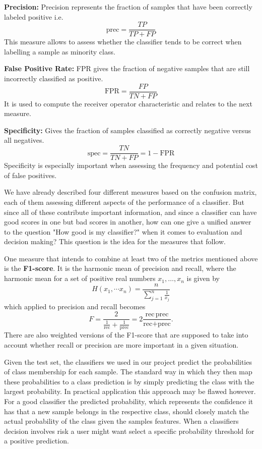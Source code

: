 \textbf{Precision:}
Precision represents the fraction of samples that have been correctly labeled positive i.e.
\[
	\text{prec} = \frac{TP}{TP + FP}
\]
This measure allows to assess whether the classifier tends to be correct when labelling a sample as minority class.


\textbf{False Positive Rate:}
FPR gives the fraction of negative samples that are still incorrectly classified as positive.
\[
	\text{FPR} = \frac{FP}{TN + FP}
\]
It is used to compute the receiver operator characteristic and relates to the next measure.

\textbf{Specificity:}
Gives the fraction of samples classified as correctly negative versus all negatives.
\[
	\text{spec} = \frac{TN}{TN + FP} = 1 - \text{FPR}
\]
Specificity is especially important when assessing the frequency and potential cost of false positives.


We have already described four different measures based on the confusion matrix, each of them assessing different aspects of the performance of a classifier.
But since all of these contribute important information, and since a classifier can have good scores in one but bad scores in another, 
how can one give a unified answer to the question "How good is my classifier?" when it comes to evaluation and decision making?
This question is the idea for the measures that follow.

One measure that intends to combine at least two of the metrics mentioned above is the \textbf{F1-score}.
It is the harmonic mean of precision and recall, where the harmonic mean for a set of positive real numbers $x_1, \dots, x_n$ is given by
\[
	H(x_1, \dotsm x_n) = \frac{n}{\sum_{j=1}^n \frac{1}{x_j}}
\]
which applied to precision and recall becomes
\[
	F = \frac{2}{ \frac{1}{\text{rec}} + \frac{1}{\text{prec}} } = 2 \frac{\text{rec} \, \text{prec}}{ \text{rec} + \text{prec} }.
\]
There are also weighted versions of the F1-score that are supposed to take into account whether recall or precision are more important in a given situation.

Given the test set, the classifiers we used in our project predict the probabilities of class membership for each sample.
The standard way in which they then map these probabilities to a class prediction is by simply predicting the class with the largest probability.
In practical application this approach may be flawed however. 
For a good classifier the predicted probability, which represents the confidence it has that a new sample belongs in the respective class, 
should closely match the actual probability of the class given the samples features. 
When a classifiers decision involves risk a user might want select a specific probability threshold for a positive prediction.


